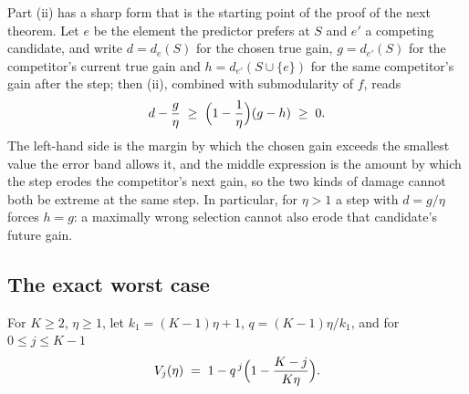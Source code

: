 Part (ii) has a sharp form that is the starting point of the proof of the next
theorem.  Let $e$ be the element the predictor prefers at $S$ and $e'$ a
competing candidate, and write $d=d_{e}(S)$ for the chosen true gain,
$g=d_{e'}(S)$ for the competitor's current true gain and
$h=d_{e'}(S\cup\{e\})$ for the same competitor's gain after the step; then
(ii), combined with submodularity of $f$, reads
\[
  d-\frac g\eta\;\ge\;\Bigl(1-\frac1\eta\Bigr)(g-h)\;\ge\;0 .
\]
The left-hand side is the margin by which the chosen gain exceeds the smallest
value the error band allows it, and the middle expression is the amount by
which the step erodes the competitor's next gain, so the two kinds of damage
cannot both be extreme at the same step.  In particular, for $\eta>1$ a step
with $d=g/\eta$ forces $h=g$: a maximally wrong selection cannot also erode
that candidate's future gain.

\subsection{The exact worst case}\label{sec:exact}

For $K\ge2$, $\eta\ge1$, let $k_1=(K-1)\eta+1$, $q=(K-1)\eta/k_1$, and for
$0\le j\le K-1$
\[
  V_j(\eta)\;=\;1-q^{\,j}\Bigl(1-\frac{K-j}{K\eta}\Bigr).
\]

